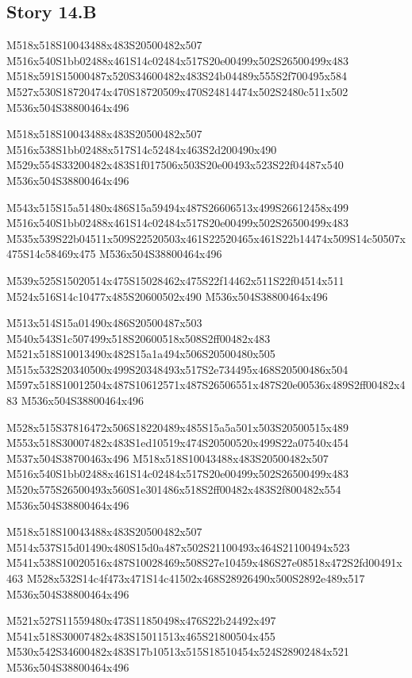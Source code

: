 \documentclass{article}
\begin{document}
\subsection{Story 14.B}

\begin{multicols}{5}
\begin{center}

M518x518S10043488x483S20500482x507 %
M516x540S1bb02488x461S14c02484x517S20e00499x502S26500499x483 %
M518x591S15000487x520S34600482x483S24b04489x555S2f700495x584 %
M527x530S18720474x470S18720509x470S24814474x502S2480c511x502 %
M536x504S38800464x496 %

M518x518S10043488x483S20500482x507 %
M516x538S1bb02488x517S14c52484x463S2d200490x490 %
M529x554S33200482x483S1f017506x503S20e00493x523S22f04487x540 %
M536x504S38800464x496 %

M543x515S15a51480x486S15a59494x487S26606513x499S26612458x499 %
M516x540S1bb02488x461S14c02484x517S20e00499x502S26500499x483 %
M535x539S22b04511x509S22520503x461S22520465x461S22b14474x509S14c50507x475S14c58469x475 %
M536x504S38800464x496 %

M539x525S15020514x475S15028462x475S22f14462x511S22f04514x511 %
M524x516S14c10477x485S20600502x490 %
M536x504S38800464x496 %

M513x514S15a01490x486S20500487x503 %
M540x543S1c507499x518S20600518x508S2ff00482x483 %
M521x518S10013490x482S15a1a494x506S20500480x505 %
M515x532S20340500x499S20348493x517S2e734495x468S20500486x504 %
M597x518S10012504x487S10612571x487S26506551x487S20e00536x489S2ff00482x483 %
M536x504S38800464x496 %

M528x515S37816472x506S18220489x485S15a5a501x503S20500515x489 %
M553x518S30007482x483S1ed10519x474S20500520x499S22a07540x454 %
M537x504S38700463x496 %
M518x518S10043488x483S20500482x507 %
M516x540S1bb02488x461S14c02484x517S20e00499x502S26500499x483 %
M520x575S26500493x560S1e301486x518S2ff00482x483S2f800482x554 %
M536x504S38800464x496 %

M518x518S10043488x483S20500482x507 %
M514x537S15d01490x480S15d0a487x502S21100493x464S21100494x523 %
M541x538S10020516x487S10028469x508S27e10459x486S27e08518x472S2fd00491x463 %
M528x532S14c4f473x471S14c41502x468S28926490x500S2892e489x517 %
M536x504S38800464x496 %

M521x527S11559480x473S11850498x476S22b24492x497 %
M541x518S30007482x483S15011513x465S21800504x455 %
M530x542S34600482x483S17b10513x515S18510454x524S28902484x521 %
M536x504S38800464x496 %

\end{center}
\end{multicols}
\end{document}
